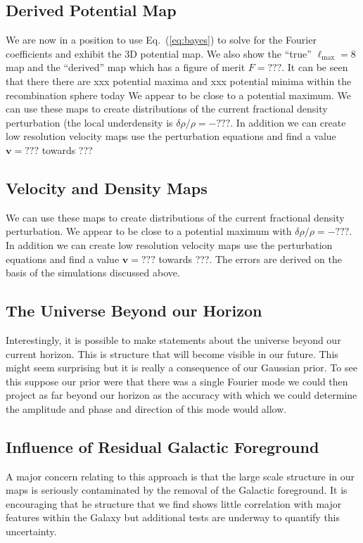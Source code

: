 \documentclass[useAMS,usenatbib,a4paper]{mn2e}
\begin{document}
\subsection{Derived Potential Map}
We are now in a position to use Eq.~(\ref{eq:bayes}) to solve for the Fourier coefficients and exhibit the 3D potential map. We also show the ``true'' $\ell_\mathrm{max}=8$ map and the ``derived'' map which has a figure of merit $F=???$.  It can be seen that there there are xxx potential maxima and xxx potential minima within the recombination sphere today We appear to be close to a potential maximum. We can use these maps to create distributions of the current fractional density perturbation (the local underdensity is $\delta\rho/\rho=-???$. In addition we can create low resolution velocity maps use the perturbation equations and find a value ${\mathbf v} =???$ towards ???
\subsection{Velocity and Density Maps}
We can use these maps to create distributions of the current fractional density perturbation. We appear to be close to a potential maximum with $\delta\rho/\rho=-???$. In addition we can create low resolution velocity maps use the perturbation equations and find a value ${\mathbf v} =???$ towards ???. The errors are derived on the basis of the simulations discussed above.
\subsection{The Universe Beyond our Horizon}
Interestingly, it is possible to make statements about the universe beyond our current horizon. This is structure that will become visible in our future. This might seem surprising but it is really a consequence of our Gaussian prior. To see this suppose our prior were that there was a single Fourier mode we could then project as far beyond our horizon as the accuracy with which we could determine the amplitude and phase and direction of this mode would allow. 
\subsection{Influence of Residual Galactic Foreground}
A major concern relating to this approach is that the large scale structure in our maps is seriously contaminated by the removal of the Galactic foreground. It is encouraging that he structure that we find shows little correlation with major features within the Galaxy but additional tests are underway to quantify this uncertainty.
\end{document}
